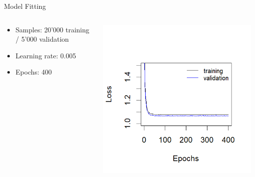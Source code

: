 \documentclass[onlytextwidth,english]{beamer}\usepackage[]{graphicx}\usepackage[]{xcolor}
\begin{document}
\begin{frame}{Model Fitting}
  \begin{columns}
    \begin{column}{0.5\linewidth}
      \begin{itemize}
        \item Samples: 20'000 training / 5'000 validation
        \item Learning rate: 0.005
        \item Epochs: 400
      \end{itemize}
    \end{column}
    \begin{column}{0.5\linewidth}
      \centering
      \includegraphics[width=\linewidth]{img/Loss_Example.png}
    \end{column}
  \end{columns}
\end{frame}
\end{document}
